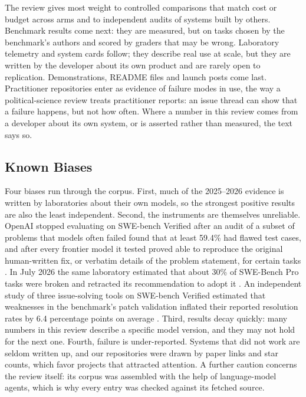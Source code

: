 The review gives most weight to controlled comparisons that match cost or budget across arms and to independent audits of systems built by others. Benchmark results come next: they are measured, but on tasks chosen by the benchmark's authors and scored by graders that may be wrong. Laboratory telemetry and system cards follow; they describe real use at scale, but they are written by the developer about its own product and are rarely open to replication. Demonstrations, README files and launch posts come last. Practitioner repositories enter as evidence of failure modes in use, the way a political-science review treats practitioner reports: an issue thread can show that a failure happens, but not how often. Where a number in this review comes from a developer about its own system, or is asserted rather than measured, the text says so.

\subsection{Known Biases}

Four biases run through the corpus. First, much of the 2025--2026 evidence is written by laboratories about their own models, so the strongest positive results are also the least independent. Second, the instruments are themselves unreliable. OpenAI stopped evaluating on SWE-bench Verified after an audit of a subset of problems that models often failed found that at least 59.4\% had flawed test cases, and after every frontier model it tested proved able to reproduce the original human-written fix, or verbatim details of the problem statement, for certain tasks \citep{C15}. In July 2026 the same laboratory estimated that about 30\% of SWE-Bench Pro tasks were broken and retracted its recommendation to adopt it \citep{V31}. An independent study of three issue-solving tools on SWE-bench Verified estimated that weaknesses in the benchmark's patch validation inflated their reported resolution rates by 6.4 percentage points on average \citep{V12}. Third, results decay quickly: many numbers in this review describe a specific model version, and they may not hold for the next one. Fourth, failure is under-reported. Systems that did not work are seldom written up, and our repositories were drawn by paper links and star counts, which favor projects that attracted attention. A further caution concerns the review itself: its corpus was assembled with the help of language-model agents, which is why every entry was checked against its fetched source.
